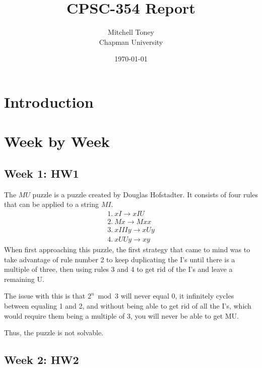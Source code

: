 \documentclass{article}
\title{CPSC-354 Report}
\author{Mitchell Toney  \\ Chapman University}
\date{\today}
\theoremstyle{theorem}
\theoremstyle{definition}
\theoremstyle{remark}
\begin{document}
\maketitle

\begin{abstract}
\end{abstract}

\setcounter{tocdepth}{3}
\tableofcontents

\section{Introduction}\label{intro}

\section{Week by Week}\label{homework}

\subsection{Week 1: HW1}
The $MU$ puzzle is a puzzle created by Douglas Hofstadter. It consists of four rules that can be applied to a string $MI$.
\[
\begin{array}{l}
1.\ xI \rightarrow xIU \\
2.\ Mx \rightarrow Mxx \\
3.\ xIIIy \rightarrow xUy \\
4.\ xUUy \rightarrow xy 
\end{array}
\]
When first approaching this puzzle, the first strategy that came to mind was to take advantage of rule number 2 to keep duplicating the I's until there is a multiple of three, then using rules 3 and 4 to get rid of the I's and leave a remaining U.

The issue with this is that $2^{n}\bmod 3$ will never equal 0, it infinitely cycles between equaling 1 and 2, and without being able to get rid of all the I's, which would require them being a multiple of 3, you will never be able to get MU.

Thus, the puzzle is not solvable.

\subsection{Week 2: HW2}
\end{document}
